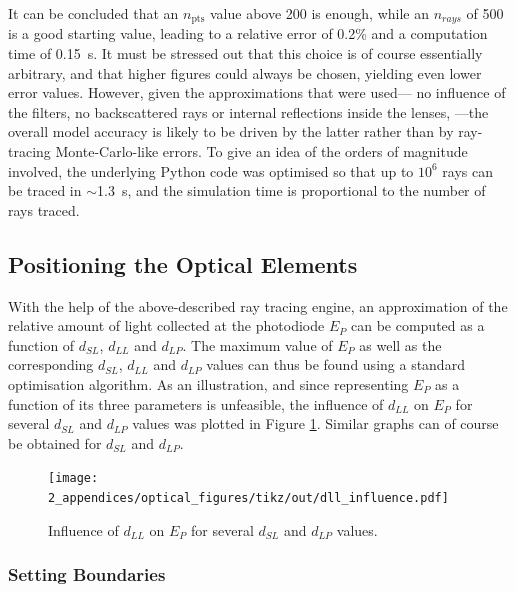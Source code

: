 It can be concluded that an $n_\mathrm{pts}$ value above 200 is enough, while an $n_{rays}$ of 500 is a good starting value, leading to a relative error of 0.2\% and a computation time of 0.15~s. It must be stressed out that this choice is of course essentially arbitrary, and that higher figures could always be chosen, yielding even lower error values. However, given the approximations that were used---\eg{} no influence of the filters, no backscattered rays or internal reflections inside the lenses, \etc{}---the overall model accuracy is likely to be driven by the latter rather than by ray-tracing Monte-Carlo-like errors. To give an idea of the orders of magnitude involved, the underlying Python code was optimised so that up to $10^6$ rays can be traced in $\sim$1.3~s, and the simulation time is proportional to the number of rays traced.

\FloatBarrier

\subsection{Positioning the Optical Elements}

With the help of the above-described ray tracing engine, an approximation of the relative amount of light collected at the photodiode $E_P$ can be computed as a function of $d_{SL}$, $d_{LL}$ and $d_{LP}$. The maximum value of $E_P$ as well as the corresponding $d_{SL}$, $d_{LL}$ and $d_{LP}$ values can thus be found using a standard optimisation algorithm. As an illustration, and since representing $E_P$ as a function of its three parameters is unfeasible, the influence of $d_{LL}$ on $E_P$ for several $d_{SL}$ and $d_{LP}$ values was plotted in Figure \ref{anfig:optics:d_ll_influence}. Similar graphs can of course be obtained for $d_{SL}$ and $d_{LP}$.

\begin{figure}
	\centering
	\texttt{[image: 2\_appendices/optical\_figures/tikz/out/dll\_influence.pdf]}
	\caption{Influence of $d_{LL}$ on $E_P$ for several $d_{SL}$ and $d_{LP}$ values.}
	\label{anfig:optics:d_ll_influence}
\end{figure}

\subsubsection{Setting Boundaries}

